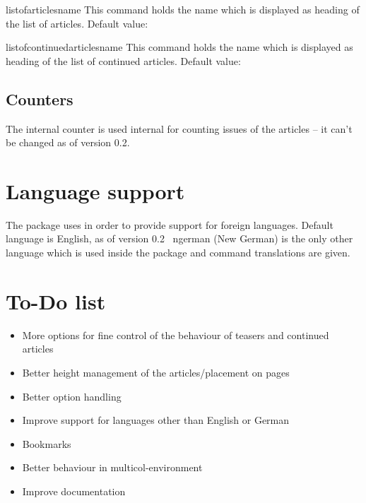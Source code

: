 \documentclass[12pt,english]{ltxdoc}
\newcommand{\packagename}[1]{\fbox{\textcolor{blue}{\textbf{\ding{41}~#1}}}\index{Package!#1}}%
\def\packageversion{0.2}%
\begin{document}
\begin{docCommand}{listofarticlesname}{}
  This command holds the name which is displayed as heading of the list of articles. Default value: \textbf{\listofarticlesname}
\end{docCommand}

\begin{docCommand}{listofcontinuedarticlesname}{}
  This command holds the name which is displayed as heading of the list of continued articles. Default value: \textbf{\listofcontinuedarticlesname}
\end{docCommand}

\subsection{Counters}

The internal counter  is used internal for counting issues of the articles -- it can't be changed as of version \packageversion.


\clearpage

\section{Language support}\label{sec::language_support}

The package uses \packagename{babel} in order to provide support for foreign languages. Default language is English, as of version \packageversion~ ngerman (New German) is the only other language which is used inside the package and command translations are given. 






\section{To-Do list}

\begin{itemize}
\item More options for fine control of the behaviour of teasers and continued articles
\item Better height management of the articles/placement on pages
\item Better option handling
\item Improve support for languages other than English or German 
\item Bookmarks
\item Better behaviour in multicol-environment
\item Improve documentation

\end{itemize}
\end{document}
